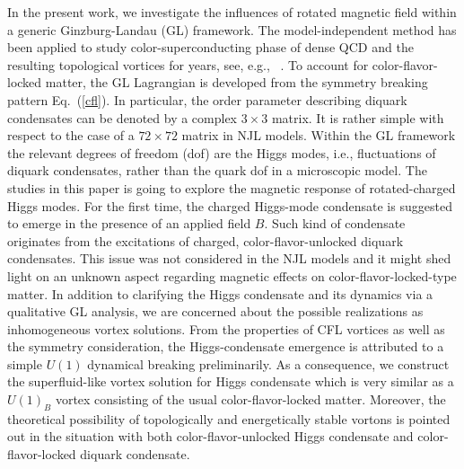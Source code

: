 \documentclass[12pt]{article}
\begin{document}
In the present work, we investigate the influences of rotated magnetic field within a generic Ginzburg-Landau (GL) framework. The model-independent method has been applied to study color-superconducting phase of dense QCD and the resulting 
topological vortices for years, see, e.g., ~\cite{giannakis2002ginzburg,iida2002superfluid,balachandran2006semisuperfluid,nakano2008non,eto2014vortices,zhang2015magnetic}.
To account for color-flavor-locked matter, the GL Lagrangian is developed from the symmetry breaking pattern Eq.~(\ref{cfl}).
In particular, the order parameter describing diquark condensates can be denoted by a complex $3\times3$ matrix. It is rather simple with respect to the case of a $72 \times 72$ matrix in NJL models. Within the GL framework the relevant degrees of freedom (dof) are the Higgs modes, i.e., fluctuations of diquark condensates, rather than the quark dof in a microscopic model.
The studies in this paper is going to explore the magnetic response of rotated-charged Higgs modes. 
For the first time, the charged Higgs-mode condensate is suggested to emerge in the presence of an applied field $B$.
Such kind of condensate originates from the excitations of charged, color-flavor-unlocked diquark condensates. 
%
This issue was not considered in the NJL models and it might shed light on an unknown aspect regarding magnetic effects on color-flavor-locked-type matter.
In addition to clarifying the Higgs condensate and its dynamics via a qualitative GL analysis, we are concerned about the possible realizations as inhomogeneous vortex solutions. 
From the properties of CFL vortices as well as the symmetry consideration, the Higgs-condensate emergence is attributed to a simple $U(1)$ dynamical breaking preliminarily. 
As a consequence, we construct the superfluid-like vortex solution for Higgs condensate which is very similar as 
a $U(1)_B$ vortex consisting of the usual color-flavor-locked matter.
Moreover, the theoretical possibility of topologically and energetically stable vortons is pointed out in the situation with both color-flavor-unlocked Higgs condensate and color-flavor-locked diquark condensate.
\end{document}

